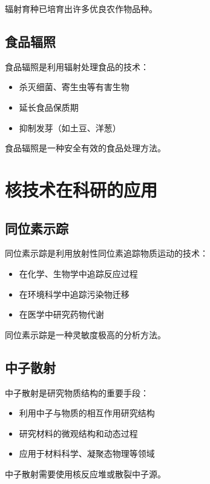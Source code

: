 \documentclass[12pt,UTF8]{ctexbook}
\begin{document}
辐射育种已培育出许多优良农作物品种。

\section{食品辐照}

食品辐照是利用辐射处理食品的技术：

\begin{itemize}[leftmargin=2cm]
    \item 杀灭细菌、寄生虫等有害生物
    \item 延长食品保质期
    \item 抑制发芽（如土豆、洋葱）
\end{itemize}

食品辐照是一种安全有效的食品处理方法。

\chapter{核技术在科研的应用}

\section{同位素示踪}

同位素示踪是利用放射性同位素追踪物质运动的技术：

\begin{itemize}[leftmargin=2cm]
    \item 在化学、生物学中追踪反应过程
    \item 在环境科学中追踪污染物迁移
    \item 在医学中研究药物代谢
\end{itemize}

同位素示踪是一种灵敏度极高的分析方法。

\section{中子散射}

中子散射是研究物质结构的重要手段：

\begin{itemize}[leftmargin=2cm]
    \item 利用中子与物质的相互作用研究结构
    \item 研究材料的微观结构和动态过程
    \item 应用于材料科学、凝聚态物理等领域
\end{itemize}

中子散射需要使用核反应堆或散裂中子源。
\end{document}

